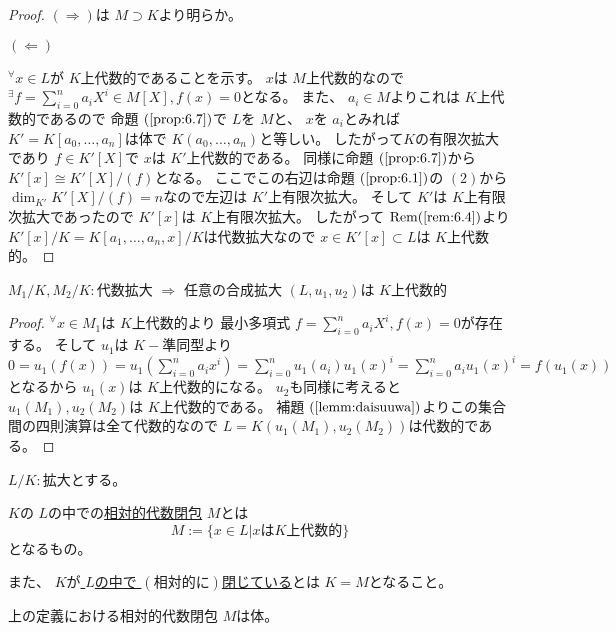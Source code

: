 \documentclass[../master_galois_theory]{subfiles}
\begin{document}
\begin{proof}
  $(\Rightarrow)$は $M \supset K$より明らか。

  $(\Leftarrow)$

  ${}^\forall x \in L$が $K$上代数的であることを示す。
  $x$は $M$上代数的なので ${}^\exists f = \sum_{i=0}^n a_i X^i \in M[X] , f(x) = 0$となる。
  また、 $a_i \in M$よりこれは $K$上代数的であるので
  命題 $(\mathrm{\ref{prop:6.7}})$で $L$を $M$と、 $x$を $a_i$とみれば
  $K' = K[a_0 , \dots , a_n]$は体で $K(a_0 , \dots , a_n)$と等しい。
  したがって$K$の有限次拡大であり $f \in K'[X]$で $x$は $K'$上代数的である。
  同様に命題 $(\mathrm{\ref{prop:6.7}})$から $K'[x] \cong K'[X]/(f)$となる。
  ここでこの右辺は命題 $(\mathrm{\ref{prop:6.1}})$の $(2)$から
  $\dim_{K'} K'[X]/(f) = n$なので左辺は $K'$上有限次拡大。
  そして $K'$は $K$上有限次拡大であったので $K'[x]$は $K$上有限次拡大。
  したがって $\mathrm{Rem} (\mathrm{\ref{rem:6.4}})$より
  $K'[x]/K = K[a_1 , \dots , a_n , x]/K$は代数拡大なので
  $x \in K'[x] \subset L$は $K$上代数的。
\end{proof}

\begin{prop}
  $M_1/K , M_2/K:$代数拡大 $\Rightarrow$ 任意の合成拡大 $(L,u_1,u_2)$は $K$上代数的
\end{prop}

\begin{proof}
  ${}^\forall x \in M_1$は $K$上代数的より
  最小多項式 $f = \sum_{i=0}^n a_i X^i , f(x) = 0$が存在する。
  そして $u_1$は $K-$準同型より $0 = u_1(f(x)) = u_1(\sum_{i=0}^n a_i x^i) = \sum_{i=0}^n u_1(a_i) u_1(x)^i = \sum_{i=0}^n a_i u_1(x)^i = f(u_1(x))$
  となるから $u_1(x)$は $K$上代数的になる。
  $u_2$も同様に考えると $u_1(M_1) , u_2(M_2)$は $K$上代数的である。
  補題 $(\mathrm{\ref{lemm:daisuuwa}})$よりこの集合間の四則演算は全て代数的なので
  $L = K(u_1(M_1) , u_2(M_2))$は代数的である。
\end{proof}

\begin{defi}
  $L/K:$拡大とする。

  $K$の $L$の中での\underline{相対的代数閉包} $M$とは
  \[
  M := \{ x \in L | x は K上代数的\}
  \]
  となるもの。

  また、 $K$が\underline{ $L$の中で $(相対的に)$閉じている}とは
  $K = M$となること。
\end{defi}

\begin{prop}
  上の定義における相対的代数閉包 $M$は体。
\end{prop}
\end{document}

